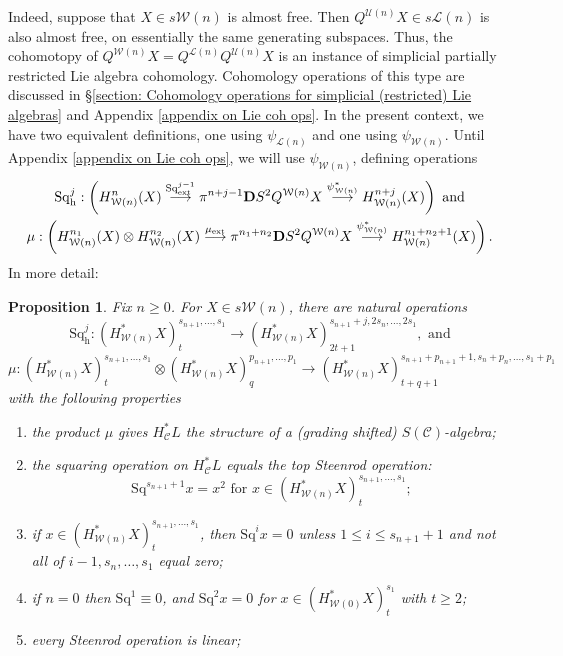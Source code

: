 \documentclass[11pt]{amsart} \renewcommand{\baselinestretch}{1.2}
\theoremstyle{plain}
\newtheorem{prop}[thm]{Proposition}
\theoremstyle{definition}
\renewcommand{\to}{\longrightarrow}
\newcommand{\scrC}{\mathscr{C}}
\newcommand{\calU}{\mathcal{U}}
\newcommand{\calL}{\mathcal{L}}
\newcommand{\calw}{\mathcal{W}}
\newcommand{\calc}{\mathcal{C}}
\newcommand{\CommOperad}{{\scrC}}
\newcommand{\ExtCohOp}{\mathrm{Sq}_\mathrm{ext}}
\newcommand{\ExtCohProd}{\mu_\mathrm{ext}}
\newcommand{\Sq}{\mathrm{Sq}}
\newcommand{\dhor}{_\mathrm{h}}
\newcommand{\Sqh}{\mathrm{Sq}\dhor}
\newcommand{\dual}{\mathbf{D}}
\begin{document}
\begin{Cohomology Operations for W and U}
Indeed, suppose that $X\in s\calw(n)$ is almost free. Then $Q^{\calU(n)}X\in s\calL(n)$ is also almost free, on essentially the same generating subspaces. Thus, the cohomotopy of $Q^{\calw(n)}X=Q^{\calL(n)}Q^{\calU(n)}X$ is an instance of simplicial partially restricted Lie algebra cohomology. Cohomology operations of this type are discussed in \S\ref{section: Cohomology operations for simplicial (restricted) Lie algebras} and Appendix \ref{appendix on Lie coh ops}. In the present context, we have two equivalent definitions, one using $\psi_{\calL(n)}$ and one using $\psi_{\calw(n)}$. Until Appendix \ref{appendix on Lie coh ops}, we will use $\psi_{\calw(n)}$, defining operations
\begin{gather*}
\Sqh^j:\left(H_{\calw(n)}^{n}(X)\overset{\ExtCohOp^{j-1}}{\to} \pi^{n+j-1}\dual S^2Q^{\calw(n)}X\overset{\psi_{\calw(n)}^*}{\to} H_{\calw(n)}^{n+j}(X)\right)\textup{ and}\\
\mu:\left(H_{\calw(n)}^{n_1}(X)\otimes H_{\calw(n)}^{n_2}(X)\overset{\ExtCohProd}{\to} \pi^{n_1+n_2}\dual S^2Q^{\calw(n)}X\overset{\psi_{\calw(n)}^*}{\to} H_{\calw(n)}^{n_1+n_2+1}(X)\right).
\end{gather*}
In more detail:
\begin{prop}
\label{Wn Halg omnibus}
Fix $n\geq0$. For $X\in s\calw(n)$, there are natural operations
\[\Sqh^j:(H^*_{\calw(n)}X)_t^{s_{n+1},\ldots,s_1}\to (H^*_{\calw(n)}X)_{2t+1}^{s_{n+1}+j,2s_{n},\ldots,2s_1},\text{ and}\]
\[\mu:(H^*_{\calw(n)}X)_t^{s_{n+1},\ldots,s_1}\otimes (H^*_{\calw(n)}X)_q^{p_{n+1},\ldots,p_1}\to (H^*_{\calw(n)}X)_{t+q+1}^{s_{n+1}+p_{n+1}+1,s_{n}+p_{n},\ldots,s_1+p_1}\]
with the following properties
\begin{enumerate}
\item the product $\mu$ gives $H^*_{\calc}L$ the structure of a (grading shifted) $S(\CommOperad)$-algebra;
\item the squaring operation on $H^*_{\calc}L$ equals the \emph{top Steenrod operation}:
\[\Sq^{s_{n+1}+1}x=x^{2}\text{\ \ for $x\in (H^*_{\calw(n)}X)_t^{s_{n+1},\ldots,s_1}$};\]
\item \label{Sq unstable vanishing II} if $x\in (H^*_{\calw(n)}X)_t^{s_{n+1},\ldots,s_1}$, then $\Sq^ix=0$ unless $1\leq i\leq s_{n+1}+1$ and not all of $i-1,s_{n},\ldots,s_1$ equal zero;
\item \label{Sq unstable vanishing III} if $n=0$ then $\Sq^1\equiv 0$, and $\Sq^2x=0$ for $x\in (H^*_{\calw(0)}X)_t^{s_1}$ with $t\geq 2$;
\item every Steenrod operation is linear;

\end{enumerate}
\end{prop}
\end{Cohomology Operations for W and U}
\end{document}
